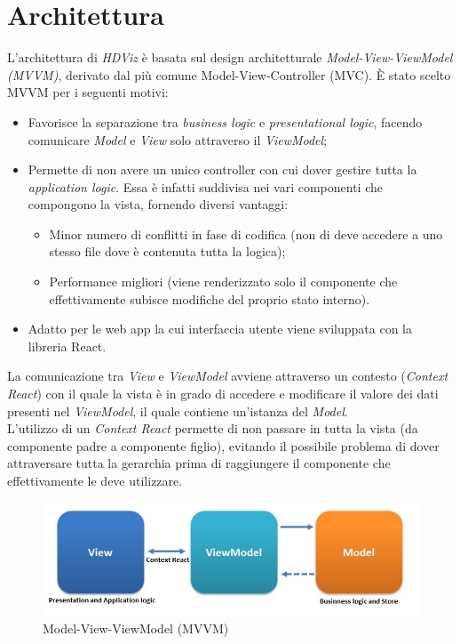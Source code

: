 \section{Architettura}
L'architettura di \textit{HDViz} è basata sul design architetturale \textit{Model-View-ViewModel (MVVM)}, derivato dal più comune Model-View-Controller (MVC). 
È stato scelto MVVM per i seguenti motivi: 
\begin{itemize}
	\item Favorisce la separazione tra \textit{business logic} e \textit{presentational logic}, facendo comunicare \textit{Model} e \textit{View} solo attraverso il \textit{ViewModel};  
	\item Permette di non avere un unico controller con cui dover gestire tutta la \textit{application logic}. Essa è infatti suddivisa nei vari componenti che compongono la vista, fornendo diversi vantaggi: 
	\begin{itemize}
		\item Minor numero di conflitti in fase di codifica (non di deve accedere a uno stesso file dove è contenuta tutta la logica);
		\item Performance migliori (viene renderizzato solo il componente che effettivamente subisce modifiche del proprio stato interno).
	\end{itemize}
	\item Adatto per le web app la cui interfaccia utente viene sviluppata con la libreria React.
\end{itemize}

La comunicazione tra \textit{View} e \textit{ViewModel} avviene attraverso un contesto (\textit{Context React}) con il quale la vista è in grado di accedere e modificare il valore dei dati presenti nel \textit{ViewModel}, il quale contiene un'istanza del \textit{Model}. \\
L'utilizzo di un \textit{Context React} permette di non passare  in tutta la vista (da componente padre a componente figlio), evitando il possibile problema di dover attraversare tutta la gerarchia prima di raggiungere il componente che effettivamente le deve utilizzare.
\begin{figure}[hb]
\includegraphics[width=15.8cm]{Extra/MVVMPattern}
\centering
\caption{Model-View-ViewModel (MVVM)}
\end{figure}